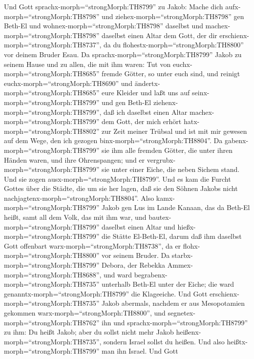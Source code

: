  Und Gott sprachx-morph=``strongMorph:TH8799'' zu Jakob:
Mache dich aufx-morph=``strongMorph:TH8798'' und
ziehex-morph=``strongMorph:TH8798'' gen Beth-El und
wohnex-morph=``strongMorph:TH8798'' daselbst und
machex-morph=``strongMorph:TH8798'' daselbst einen Altar dem Gott, der
dir erschienx-morph=``strongMorph:TH8737'', da du
flohestx-morph=``strongMorph:TH8800'' vor deinem Bruder Esau.
 Da sprachx-morph=``strongMorph:TH8799'' Jakob zu seinem
Hause und zu allen, die mit ihm waren: Tut von
euchx-morph=``strongMorph:TH8685'' fremde Götter, so unter euch sind,
und reinigt euchx-morph=``strongMorph:TH8690'' und
ändertx-morph=``strongMorph:TH8685'' eure Kleider  und laßt
uns auf seinx-morph=``strongMorph:TH8799'' und gen Beth-El
ziehenx-morph=``strongMorph:TH8799'', daß ich daselbst einen Altar
machex-morph=``strongMorph:TH8799'' dem Gott, der mich erhört
hatx-morph=``strongMorph:TH8802'' zur Zeit meiner Trübsal und ist mit
mir gewesen auf dem Wege, den ich gezogen
binx-morph=``strongMorph:TH8804''.  Da
gabenx-morph=``strongMorph:TH8799'' sie ihm alle fremden Götter, die
unter ihren Händen waren, und ihre Ohrenspangen; und er
vergrubx-morph=``strongMorph:TH8799'' sie unter einer Eiche, die neben
Sichem stand.  Und sie zogen
ausx-morph=``strongMorph:TH8799''. Und es kam die Furcht Gottes über die
Städte, die um sie her lagen, daß sie den Söhnen Jakobs nicht
nachjagtenx-morph=``strongMorph:TH8804''.  Also
kamx-morph=``strongMorph:TH8799'' Jakob gen Lus im Lande Kanaan, das da
Beth-El heißt, samt all dem Volk, das mit ihm war,  und
bautex-morph=``strongMorph:TH8799'' daselbst einen Altar und
hießx-morph=``strongMorph:TH8799'' die Stätte El-Beth-El, darum daß ihm
daselbst Gott offenbart warx-morph=``strongMorph:TH8738'', da er
flohx-morph=``strongMorph:TH8800'' vor seinem Bruder.  Da
starbx-morph=``strongMorph:TH8799'' Debora, der Rebekka
Ammex-morph=``strongMorph:TH8688'', und ward
begrabenx-morph=``strongMorph:TH8735'' unterhalb Beth-El unter der
Eiche; die ward genanntx-morph=``strongMorph:TH8799'' die Klageeiche.
 Und Gott erschienx-morph=``strongMorph:TH8735'' Jakob
abermals, nachdem er aus Mesopotamien gekommen
warx-morph=``strongMorph:TH8800'', und
segnetex-morph=``strongMorph:TH8762'' ihn  und
sprachx-morph=``strongMorph:TH8799'' zu ihm: Du heißt Jakob; aber du
sollst nicht mehr Jakob heißenx-morph=``strongMorph:TH8735'', sondern
Israel sollst du heißen. Und also heißtx-morph=``strongMorph:TH8799''
man ihn Israel.  Und Gott
